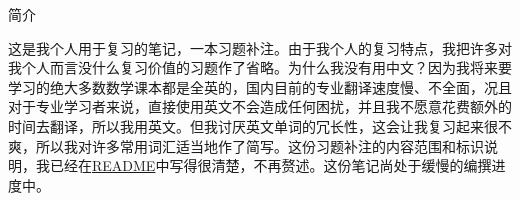 \documentclass[a4paper, 11pt, UTF8]{article}
\def\BulletPoint{{\small$\bullet$}}
\def\OR{\large O{\footnotesize R}}
\def\Solution{{\timesbfx\large S\footnotesize{OLUTION:}}\,\,\,}
\def\dbsp{$\bullet$}
\begin{document}
\begin{large}
\newcommand{\ExampleX}[1]{
	{\timesbfx E\footnotesize{XAMPLE:}} #1\vspace{-16pt}\par
	\Solution
}

\newcommand{\ExampleXnosolus}[1]{
	{\timesbfx E\footnotesize{XAMPLE:}} #1\vspace{-16pt}\par
}

\newcommand{\ProblemN}[2]{
	\Onumber{#1} #2\vspace{-16pt}\par
	\Solution
}

\newcommand{\ProblemNnosolus}[2]{
	\Onumber{#1} #2\vspace{-16pt}\par
}

\newcommand{\ProblemB}[1]{
	\BulletPoint #1\vspace{-16pt}\par
	\Solution
}


\newcommand{\ProblemBnosolus}[1]{
	\BulletPoint #1\vspace{-16pt}\par
}

\newcommand{\ProblemBc}[1]{
	$\circ$#1\vspace{-16pt}\par
	\Solution
}

\newcommand{\ProblemBnoor}[2]{
	\BulletPoint\,\hspace{0.5pt}\dbsp #1#2\vspace{-16pt}\par
	\Solution
}

\newcommand{\ProblemBor}[2]{
	\BulletPoint\,\hspace{0.5pt}\OR(#1) #2\vspace{-16pt}\par
	\Solution
}

\newcommand{\AlignEq}[2]{
\vspace{-25pt}
\begin{align*}
	#1#2
\end{align*}
\vspace{-25pt}
}

\newcommand{\ChapterDecl}[3]{{\huge\timesbfxx\hypertarget{#1}{#2}}#3\vspace{5pt}}

\centerline{\Large 简介}\vspace{4pt}\par
{\normalsize 这是我个人用于复习的笔记，一本习题补注。由于我个人的复习特点，我把许多对我个人而言没什么复习价值的习题作了省略。为什么我没有用中文？因为我将来要学习的绝大多数数学课本都是全英的，国内目前的专业翻译速度慢、不全面，况且对于专业学习者来说，直接使用英文不会造成任何困扰，并且我不愿意花费额外的时间去翻译，所以我用英文。但我讨厌英文单词的冗长性，这会让我复习起来很不爽，所以我对许多常用词汇适当地作了简写。这份习题补注的内容范围和标识说明，我已经在\href{run:./README}{README}中写得很清楚，不再赘述。这份笔记尚处于缓慢的编撰进度中。}\par



\end{large}
\end{document}
